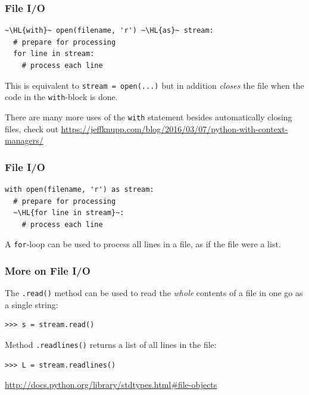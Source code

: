 \documentclass[english,serif,mathserif,xcolor=pdftex,dvipsnames,table]{beamer}
\begin{document}
\begin{frame}[fragile]
  \frametitle{File I/O}

\begin{lstlisting}
~\HL{with}~ open(filename, 'r') ~\HL{as}~ stream:
  # prepare for processing
  for line in stream:
    # process each line
\end{lstlisting}

  \+
  This is equivalent to \lstinline|stream = open(...)| but in addition
  \emph{closes} the file when the code in the \texttt{with}-block is done.

  \+
  There are many more uses of the \texttt{with} statement besides automatically
  closing files, check out \url{https://jeffknupp.com/blog/2016/03/07/python-with-context-managers/}
\end{frame}


\begin{frame}[fragile]
  \frametitle{File I/O}

\begin{lstlisting}
with open(filename, 'r') as stream:
  # prepare for processing
  ~\HL{for line in stream}~:
    # process each line
\end{lstlisting}

  \+ A \texttt{for}-loop can be used to process all lines in a file, as if the
  file were a list.
\end{frame}





\begin{frame}[fragile]
  \frametitle{More on File I/O}

  The \lstinline|.read()| method can be used to read the \emph{whole} contents
  of a file in one go as a single string:
\begin{lstlisting}
>>> s = stream.read()
\end{lstlisting}

  \+
  Method \lstinline|.readlines()| returns a list of all lines in the file:
\begin{lstlisting}
>>> L = stream.readlines()
\end{lstlisting}

  \begin{references}
    \url{http://docs.python.org/library/stdtypes.html#file-objects}
  \end{references}
\end{frame}
\end{document}

